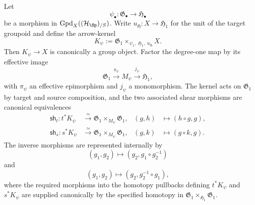 \begin{theorem}
\label{thm:kernel-bitorsor}
Let
\[
    \psi_\bullet:
    \mathfrak G_\bullet
    \longrightarrow
    \mathfrak H_\bullet
\]
be a morphism in
$\operatorname{Gpd}_X((\mathcal H_{\Sp})_{/S})$.  Write
$u_{\mathfrak H}:X\to\mathfrak H_1$ for the unit of the target groupoid and
define the arrow-kernel
\[
    K_\psi
    :=
    \mathfrak G_1
    \times_{\psi_1,\;\mathfrak H_1,\;u_{\mathfrak H}}
    X.
\]
Then $K_\psi\to X$ is canonically a group object.  Factor the degree-one map
by its effective image
\[
    \mathfrak G_1
    \xrightarrow{\pi_\psi}
    M_\psi
    \xrightarrow{j_\psi}
    \mathfrak H_1,
\]
with $\pi_\psi$ an effective epimorphism and $j_\psi$ a monomorphism.  The
kernel acts on $\mathfrak G_1$ by target and source composition, and the two
associated shear morphisms are canonical equivalences
\[
\begin{aligned}
    \mathsf{sh}_t:
    t^*K_\psi
    &\xrightarrow{\simeq}
    \mathfrak G_1\times_{M_\psi}\mathfrak G_1,
    &
    (g,h)&\longmapsto(h\circ g,g),\\
    \mathsf{sh}_s:
    s^*K_\psi
    &\xrightarrow{\simeq}
    \mathfrak G_1\times_{M_\psi}\mathfrak G_1,
    &
    (g,k)&\longmapsto(g\circ k,g).
\end{aligned}
\]
The inverse morphisms are represented internally by
\[
    (g_1,g_2)
    \longmapsto
    (g_2,g_1\circ g_2^{-1})
\]
and
\[
    (g_1,g_2)
    \longmapsto
    (g_2,g_2^{-1}\circ g_1),
\]
where the required morphisms into the homotopy pullbacks defining
$t^*K_\psi$ and $s^*K_\psi$ are supplied canonically by the specified
homotopy in
$\mathfrak G_1\times_{\mathfrak H_1}\mathfrak G_1$.
\end{theorem}


